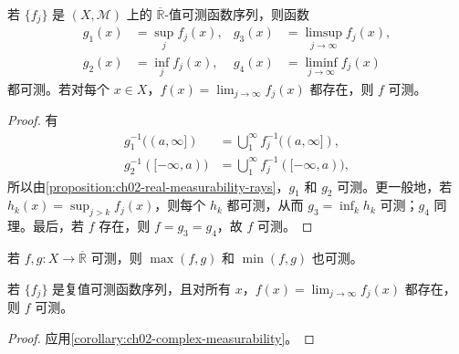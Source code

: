 \documentclass[../../main.tex]{subfiles}%
\begin{document}
\begin{proposition}\label{proposition:ch02-measurable-limits}
若 $\{f_j\}$ 是 $(X,\mathscr{M})$ 上的 $\overline{\mathbb{R}}$-值可测函数序列，则函数
\begin{align*}
g_1(x)&=\sup_j f_j(x),&g_3(x)&=\limsup_{j\to\infty}f_j(x),\\
g_2(x)&=\inf_j f_j(x),&g_4(x)&=\liminf_{j\to\infty}f_j(x)
\end{align*}
都可测。若对每个 $x\in X$，$f(x)=\lim_{j\to\infty}f_j(x)$ 都存在，则 $f$ 可测。
\end{proposition}
\begin{proof}
有
\begin{align*}
g_1^{-1}((a,\infty])&=\bigcup_1^\infty f_j^{-1}((a,\infty]),\\
g_2^{-1}([-\infty,a))&=\bigcup_1^\infty f_j^{-1}([-\infty,a)),
\end{align*}
所以由\cref{proposition:ch02-real-measurability-rays}，$g_1$ 和 $g_2$ 可测。更一般地，若 $h_k(x)=\sup_{j>k}f_j(x)$，则每个 $h_k$ 都可测，从而 $g_3=\inf_k h_k$ 可测；$g_4$ 同理。最后，若 $f$ 存在，则 $f=g_3=g_4$，故 $f$ 可测。
\end{proof}
\begin{corollary}\label{corollary:ch02-measurable-max-min}
若 $f,g:X\to\overline{\mathbb{R}}$ 可测，则 $\max(f,g)$ 和 $\min(f,g)$ 也可测。
\end{corollary}

\begin{corollary}\label{corollary:ch02-complex-pointwise-limits}
若 $\{f_j\}$ 是复值可测函数序列，且对所有 $x$，$f(x)=\lim_{j\to\infty}f_j(x)$ 都存在，则 $f$ 可测。
\end{corollary}
\begin{proof}
应用\cref{corollary:ch02-complex-measurability}。
\end{proof}
\end{document}
